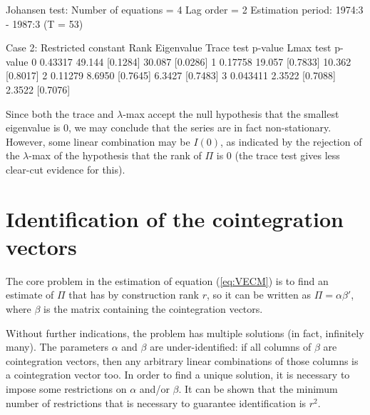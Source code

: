 \begin{center}
\begin{code}
Johansen test:
Number of equations = 4
Lag order = 2
Estimation period: 1974:3 - 1987:3 (T = 53)

Case 2: Restricted constant
Rank Eigenvalue Trace test p-value   Lmax test  p-value
   0    0.43317     49.144 [0.1284]     30.087 [0.0286]
   1    0.17758     19.057 [0.7833]     10.362 [0.8017]
   2    0.11279     8.6950 [0.7645]     6.3427 [0.7483]
   3   0.043411     2.3522 [0.7088]     2.3522 [0.7076]
\end{code}
\end{center}

Since both the trace and $\lambda$-max accept the null hypothesis that
the smallest eigenvalue is 0, we may conclude that the series are in
fact non-stationary. However, some linear combination may be $I(0)$,
as indicated by the rejection of the $\lambda$-max of the hypothesis
that the rank of $\Pi$ is 0 (the trace test gives less clear-cut
evidence for this).

\section{Identification of the cointegration vectors}
\label{sec:johansen-ident}

The core problem in the estimation of equation (\ref{eq:VECM}) is to
find an estimate of $\Pi$ that has by construction rank $r$, so it can
be written as $\Pi = \alpha \beta'$, where $\beta$ is the matrix
containing the cointegration vectors.

Without further indications, the problem has multiple solutions (in
fact, infinitely many). The parameters $\alpha$ and $\beta$ are
under-identified: if all columns of $\beta$ are cointegration vectors,
then any arbitrary linear combinations of those columns is a
cointegration vector too. In order to find a unique solution, it is
necessary to impose some restrictions on $\alpha$ and/or $\beta$. It
can be shown that the minimum number of restrictions that is necessary
to guarantee identification is $r^2$.

